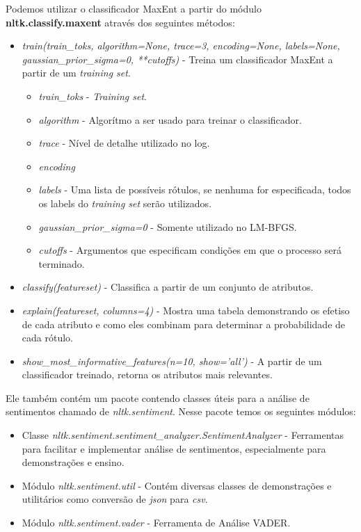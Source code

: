 Podemos utilizar o classificador \ac{MaxEnt} a partir do módulo
\textbf{nltk.classify.maxent} através dos seguintes métodos:

\begin{itemize}
  \item \textit{train(train\_toks, algorithm=None, trace=3,
  encoding=None, labels=None, gaussian\_prior\_sigma=0, **cutoffs)} - Treina um
  classificador \ac{MaxEnt} a partir de um \textit{training set}.
  \begin{itemize}
    \item \textit{train\_toks} - \textit{Training set}.
  \item \textit{algorithm} - Algorítmo a ser usado para treinar o classificador. 
  \item \textit{trace} - Nível de detalhe utilizado no log.
  \item \textit{encoding}
  \item \textit{labels} - Uma lista de possíveis rótulos, se nenhuma for
  especificada, todos os labels do \textit{training set} serão utilizados.
  \item \textit{gaussian\_prior\_sigma=0} - Somente utilizado no LM-BFGS.
  \item \textit{cutoffs} - Argumentos que especificam condições em que o
  processo será terminado.
  \end{itemize}
\item \textit{classify(featureset)} - Classifica a partir de um conjunto de
  atributos.
\item \textit{explain(featureset, columns=4)} - Mostra uma tabela demonstrando
os efetiso de cada atributo e como eles combinam para determinar a probabilidade
de cada rótulo.
\item \textit{show\_most\_informative\_features(n=10, show='all')} - A partir de
um classificador treinado, retorna os atributos mais relevantes.
\end{itemize}

Ele também contém um pacote contendo classes úteis para a análise de sentimentos
chamado de \textit{nltk.sentiment}. Nesse pacote temos os seguintes módulos:


\begin{itemize}
  \item Classe \textit{nltk.sentiment.sentiment\_analyzer.SentimentAnalyzer} -
  Ferramentas para facilitar e implementar análise de sentimentos,
  especialmente para demonstrações e ensino.
  \item Módulo \textit{nltk.sentiment.util} - Contém diversas classes de
  demonstrações e utilitários como conversão de \textit{json} para \textit{csv}.
  \item Módulo \textit{nltk.sentiment.vader} - Ferramenta de Análise VADER.
\end{itemize}

